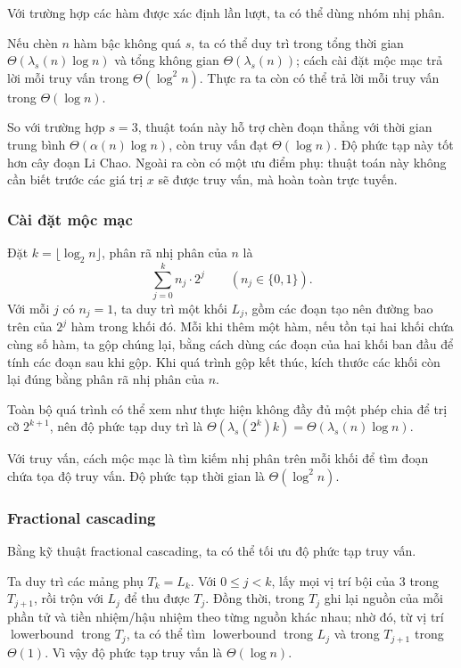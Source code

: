 \documentclass[11pt]{article}
\begin{document}
Với trường hợp các hàm được xác định lần lượt, ta có thể dùng nhóm nhị phân.

Nếu chèn \(n\) hàm bậc không quá \(s\), ta có thể duy trì trong tổng thời gian
\(\Theta(\lambda_s(n)\log n)\) và tổng không gian \(\Theta(\lambda_s(n))\); cách
cài đặt mộc mạc trả lời mỗi truy vấn trong \(\Theta(\log^2 n)\). Thực ra ta còn
có thể trả lời mỗi truy vấn trong \(\Theta(\log n)\).

So với trường hợp \(s=3\), thuật toán này hỗ trợ chèn đoạn thẳng với thời gian
trung bình \(\Theta(\alpha(n)\log n)\), còn truy vấn đạt \(\Theta(\log n)\).
Độ phức tạp này tốt hơn cây đoạn Li Chao. Ngoài ra còn có một ưu điểm phụ:
thuật toán này không cần biết trước các giá trị \(x\) sẽ được truy vấn, mà hoàn
toàn trực tuyến.

\subsubsection{Cài đặt mộc mạc}

Đặt \(k=\lfloor\log_2 n\rfloor\), phân rã nhị phân của \(n\) là
\[
  \sum_{j=0}^k n_j\cdot 2^j\qquad(n_j\in\{0,1\}).
\]
Với mỗi \(j\) có \(n_j=1\), ta duy trì một khối \(L_j\), gồm các đoạn tạo nên
đường bao trên của \(2^j\) hàm trong khối đó. Mỗi khi thêm một hàm, nếu tồn tại
hai khối chứa cùng số hàm, ta gộp chúng lại, bằng cách dùng các đoạn của hai
khối ban đầu để tính các đoạn sau khi gộp. Khi quá trình gộp kết thúc, kích
thước các khối còn lại đúng bằng phân rã nhị phân của \(n\).

Toàn bộ quá trình có thể xem như thực hiện không đầy đủ một phép chia để trị cỡ
\(2^{k+1}\), nên độ phức tạp duy trì là
\(\Theta(\lambda_s(2^k)k)=\Theta(\lambda_s(n)\log n)\).

Với truy vấn, cách mộc mạc là tìm kiếm nhị phân trên mỗi khối để tìm đoạn chứa
tọa độ truy vấn. Độ phức tạp thời gian là \(\Theta(\log^2 n)\).

\subsubsection{Fractional cascading}

Bằng kỹ thuật fractional cascading, ta có thể tối ưu độ phức tạp truy vấn.

Ta duy trì các mảng phụ \(T_k=L_k\). Với \(0\le j<k\), lấy mọi vị trí bội của
\(3\) trong \(T_{j+1}\), rồi trộn với \(L_j\) để thu được \(T_j\). Đồng thời,
trong \(T_j\) ghi lại nguồn của mỗi phần tử và tiền nhiệm/hậu nhiệm theo từng
nguồn khác nhau; nhờ đó, từ vị trí \(\operatorname{lowerbound}\) trong \(T_j\),
ta có thể tìm \(\operatorname{lowerbound}\) trong \(L_j\) và trong \(T_{j+1}\)
trong \(\Theta(1)\). Vì vậy độ phức tạp truy vấn là \(\Theta(\log n)\).
\end{document}
